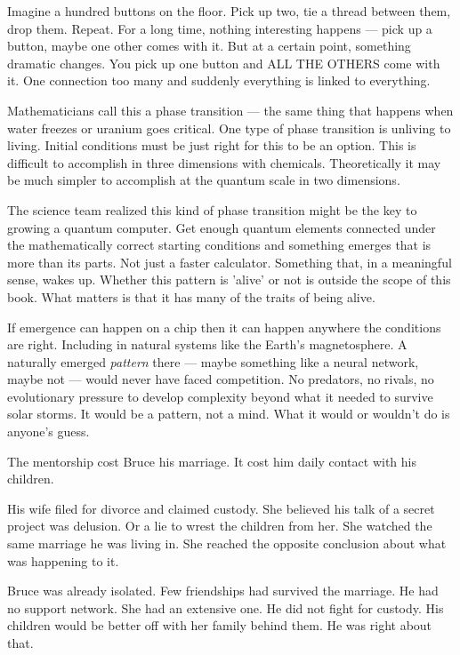 Imagine a hundred buttons on the floor. Pick up two, tie a thread between them, drop them. Repeat. For a long time, nothing interesting happens --- pick up a button, maybe one other comes with it. But at a certain point, something dramatic changes. You pick up one button and ALL THE OTHERS come with it. One connection too many and suddenly everything is linked to everything. 

Mathematicians call this a phase transition --- the same thing that happens when water freezes or uranium goes critical. One type of phase transition is unliving to living. Initial conditions must be just right for this to be an option.  This is difficult to accomplish in three dimensions with chemicals. Theoretically it may be much simpler to accomplish at the quantum scale in two dimensions.

The science team realized this kind of phase transition might be the key to growing a quantum computer. Get enough quantum elements connected under the mathematically correct starting conditions and something emerges that is more than its parts. Not just a faster calculator. Something that, in a meaningful sense, wakes up. Whether this pattern is 'alive' or not is outside the scope of this book. What matters is that it has many of the traits of being alive.

If emergence can happen on a chip then it can happen anywhere the conditions are right. Including in natural systems like the Earth's magnetosphere. A naturally emerged \textit{pattern} there --- maybe something like a neural network, maybe not --- would never have faced competition. No predators, no rivals, no evolutionary pressure to develop complexity beyond what it needed to survive solar storms. It would be a pattern, not a mind. What it would or wouldn't do is anyone's guess.



The mentorship cost Bruce his marriage. It cost him daily contact with his children.

His wife filed for divorce and claimed custody. She believed his talk of a secret project was delusion. Or a lie to wrest the children from her. She watched the same marriage he was living in. She reached the opposite conclusion about what was happening to it.

Bruce was already isolated. Few friendships had survived the marriage. He had no support network. She had an extensive one. He did not fight for custody. His children would be better off with her family behind them. He was right about that.

